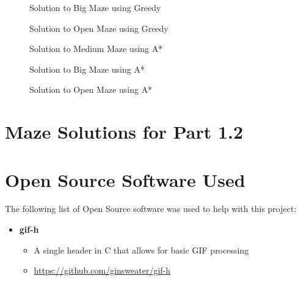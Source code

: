 \documentclass{article}[12pt]
\begin{document}
\begin{appendices}
   \begin{figure}[!htb]
   \centering
   \caption{Solution to Big Maze using Greedy}
   \label{fig:greedy_bigmaze}
   \end{figure}
   
   \begin{figure}[!htb]
   \centering
   \caption{Solution to Open Maze using Greedy}
   \label{fig:greedy_openmaze}
   \end{figure}
   
   
   \begin{figure}[!htb]
   \centering
   \caption{Solution to Medium Maze using A*}
   \label{fig:astar_medmaze}
   \end{figure}
   
   \begin{figure}[!htb]
   \centering
   \caption{Solution to Big Maze using A*}
   \label{fig:astar_bigmaze}
   \end{figure}
   
   \begin{figure}[!htb]
   \centering
   \caption{Solution to Open Maze using A*}
   \label{fig:astar_openmaze}
   \end{figure}
   
   \section{Maze Solutions for Part 1.2}
   \label{appendix:p12}
   
   \section{Open Source Software Used}
   The following list of Open Source software was used to help with this project:
   
   \begin{itemize}
   \item \textbf{gif-h}
   		\begin{itemize}
   		\item A single header in C that allows for basic GIF processing
   		\item \href{https://github.com/ginsweater/gif-h}{https://github.com/ginsweater/gif-h}
   		\end{itemize}
   \end{itemize}

\end{appendices}   
   
   
   
\end{document}
